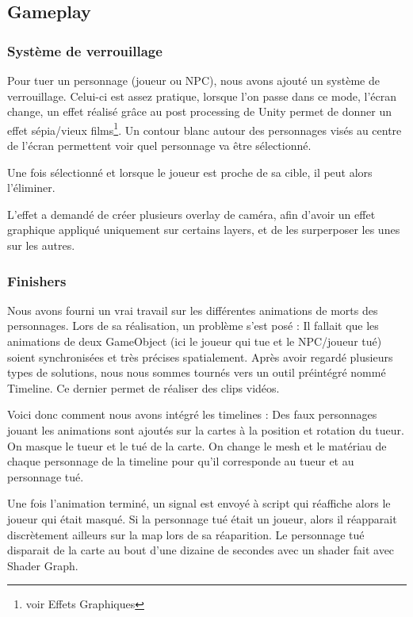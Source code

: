\subsection{Gameplay}

\subsubsection{Système de verrouillage}

Pour tuer un personnage (joueur ou NPC),
nous avons ajouté un système de verrouillage. Celui-ci est assez pratique, lorsque l'on passe dans ce mode, l'écran change,
un effet réalisé grâce au post processing de Unity permet de donner un effet sépia/vieux films\footnote{voir Effets Graphiques}.
Un contour blanc autour des personnages visés au centre de l'écran permettent voir quel personnage va être sélectionné.

Une fois sélectionné et lorsque le joueur est proche de sa cible, il peut alors l'éliminer.

L'effet a demandé de créer plusieurs overlay de caméra, afin d'avoir un effet graphique
appliqué uniquement sur certains layers, et de les surperposer les unes sur les autres. 

\subsubsection{Finishers}
Nous avons fourni un vrai travail sur les différentes animations de morts des personnages.
Lors de sa réalisation, un problème s'est posé : Il fallait que les animations de deux GameObject (ici le joueur qui tue et le NPC/joueur tué) 
soient synchronisées et très précises spatialement. Après avoir regardé plusieurs types de solutions, nous nous sommes tournés vers un outil préintégré nommé Timeline.
Ce dernier permet de réaliser des clips vidéos.

Voici donc comment nous avons intégré les timelines :
\newline
Des faux personnages jouant les animations sont ajoutés sur la cartes à la position et rotation du tueur.
On masque le tueur et le tué de la carte.
On change le mesh et le matériau de chaque personnage de la timeline pour qu'il corresponde au tueur et au
personnage tué.

Une fois l'animation terminé, un signal est envoyé à script qui réaffiche alors le joueur qui était masqué.
Si la personnage tué était un joueur, alors il réapparait discrètement ailleurs sur la map lors de sa réaparition.
Le personnage tué disparait de la carte au bout d'une dizaine de secondes avec un shader fait avec Shader Graph.

